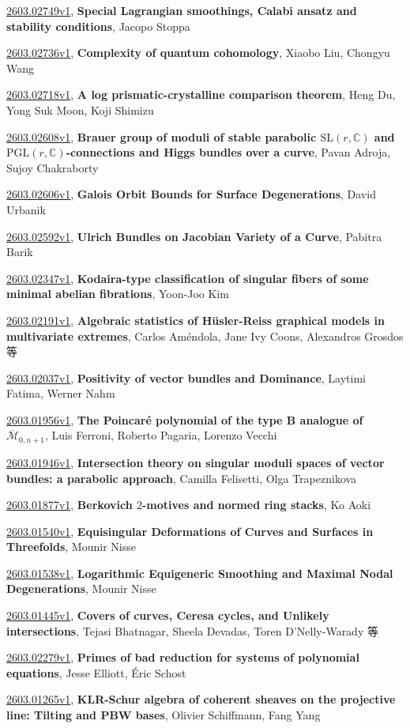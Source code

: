 \documentclass[9pt, a4paper]{article}
\theoremstyle{plain}
\theoremstyle{definition}
\theoremstyle{remark}
\newcommand{\arxiv}[3]{\href{https://arxiv.org/abs/#1}{#1}, \textbf{\textcolor{arxivblue}{#2}}, #3}
\begin{document}
\arxiv{2603.02749v1}{Special Lagrangian smoothings, Calabi ansatz and stability conditions}{Jacopo Stoppa}

\arxiv{2603.02736v1}{Complexity of quantum cohomology}{Xiaobo Liu, Chongyu Wang}

\arxiv{2603.02718v1}{A log prismatic-crystalline comparison theorem}{Heng Du, Yong Suk Moon, Koji Shimizu}

\arxiv{2603.02608v1}{Brauer group of moduli of stable parabolic $\text{SL}(r,\mathbb{C})$ and $\text{PGL}(r,\mathbb{C})$-connections and Higgs bundles over a curve}{Pavan Adroja, Sujoy Chakraborty}

\arxiv{2603.02606v1}{Galois Orbit Bounds for Surface Degenerations}{David Urbanik}

\arxiv{2603.02592v1}{Ulrich Bundles on Jacobian Variety of a Curve}{Pabitra Barik}

\arxiv{2603.02347v1}{Kodaira-type classification of singular fibers of some minimal abelian fibrations}{Yoon-Joo Kim}

\arxiv{2603.02191v1}{Algebraic statistics of Hüsler-Reiss graphical models in multivariate extremes}{Carlos Améndola, Jane Ivy Coons, Alexandros Grosdos 等}

\arxiv{2603.02037v1}{Positivity of vector bundles and Dominance}{Laytimi Fatima, Werner Nahm}

\arxiv{2603.01956v1}{The Poincaré polynomial of the type B analogue of $\overline{\mathcal{M}}_{0,n+1}$}{Luis Ferroni, Roberto Pagaria, Lorenzo Vecchi}

\arxiv{2603.01946v1}{Intersection theory on singular moduli spaces of vector bundles: a parabolic approach}{Camilla Felisetti, Olga Trapeznikova}

\arxiv{2603.01877v1}{Berkovich $2$-motives and normed ring stacks}{Ko Aoki}

\arxiv{2603.01540v1}{Equisingular Deformations of Curves and Surfaces in Threefolds}{Mounir Nisse}

\arxiv{2603.01538v1}{Logarithmic Equigeneric Smoothing and Maximal Nodal Degenerations}{Mounir Nisse}

\arxiv{2603.01445v1}{Covers of curves, Ceresa cycles, and Unlikely intersections}{Tejasi Bhatnagar, Sheela Devadas, Toren D'Nelly-Warady 等}

\arxiv{2603.02279v1}{Primes of bad reduction for systems of polynomial equations}{Jesse Elliott, Éric Schost}

\arxiv{2603.01265v1}{KLR-Schur algebra of coherent sheaves on the projective line: Tilting and PBW bases}{Olivier Schiffmann, Fang Yang}
\end{document}
